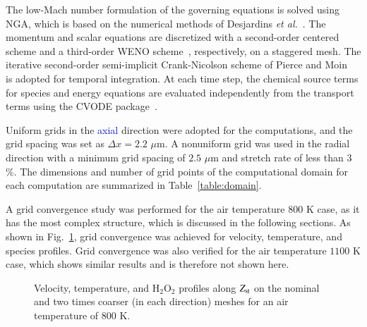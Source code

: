 \documentclass[review,3p,times]{elsarticle}
\begin{document}
The low-Mach number formulation of the governing equations is solved using NGA, which is based on the numerical methods of Desjardins \emph{et al.}~\cite{desjardins08}.  The momentum and scalar equations are discretized with a second-order centered scheme and a third-order WENO scheme~\cite{liu94}, respectively, on a staggered mesh.  The iterative second-order semi-implicit Crank-Nicolson scheme of Pierce and Moin~\cite{pierce01} is adopted for temporal integration.  At each time step, the chemical source terms for species and energy equations are evaluated independently from the transport terms using the CVODE package~\cite{cohen96}.

Uniform grids in the \textcolor{blue}{axial} direction were adopted for the computations, and the grid spacing was set as $\Delta x = 2.2$ $\mu$m.  A nonuniform grid was used in the radial direction with a minimum grid spacing of $2.5$ $\mu$m and stretch rate of less than $3$\%.  The dimensions and number of grid points of the computational domain for each computation are summarized in Table~\ref{table:domain}.

\begin{table}
  \caption{Computational domain and number of grid points.}
  \label{table:domain}
  \centering
  \normalsize
\end{table}

A grid convergence study was performed for the air temperature $800$ K case, as it has the most complex structure, which is discussed in the following sections.  As shown in Fig.~\ref{fig:convergence}, grid convergence was achieved for velocity, temperature, and species profiles.  Grid convergence was also verified for the air temperature $1100$ K case, which shows similar results and is therefore not shown here.  

\begin{figure}
  \centering
  \scriptsize
  \hspace{-0.40625in}
  
  \hspace{-0.40625in}
  
  \hspace{-0.40625in}
  
  \normalsize
  \caption{Velocity, temperature, and H$_2$O$_2$ profiles along $Z_{\rm st}$ on the nominal and two times coarser (in each direction) meshes for an air temperature of $800$ K.}
  \label{fig:convergence}
\end{figure}
\end{document}
